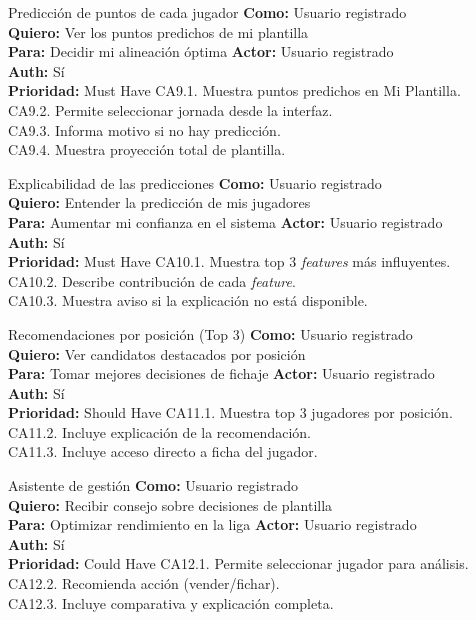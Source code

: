 {Predicción de puntos de cada jugador}
{\textbf{Como:} Usuario registrado\\ \textbf{Quiero:} Ver los puntos predichos de mi plantilla\\ \textbf{Para:} Decidir mi alineación óptima}
{\textbf{Actor:} Usuario registrado\\ \textbf{Auth:} Sí\\ \textbf{Prioridad:} Must Have}
{CA9.1. Muestra puntos predichos en Mi Plantilla.\\ CA9.2. Permite seleccionar jornada desde la interfaz.\\ CA9.3. Informa motivo si no hay predicción.\\ CA9.4. Muestra proyección total de plantilla.}

{Explicabilidad de las predicciones}
{\textbf{Como:} Usuario registrado\\ \textbf{Quiero:} Entender la predicción de mis jugadores\\ \textbf{Para:} Aumentar mi confianza en el sistema}
{\textbf{Actor:} Usuario registrado\\ \textbf{Auth:} Sí\\ \textbf{Prioridad:} Must Have}
{CA10.1. Muestra top 3 \textit{features} más influyentes.\\ CA10.2. Describe contribución de cada \textit{feature}.\\ CA10.3. Muestra aviso si la explicación no está disponible.}

{Recomendaciones por posición (Top 3)}
{\textbf{Como:} Usuario registrado\\ \textbf{Quiero:} Ver candidatos destacados por posición\\ \textbf{Para:} Tomar mejores decisiones de fichaje}
{\textbf{Actor:} Usuario registrado\\ \textbf{Auth:} Sí\\ \textbf{Prioridad:} Should Have}
{CA11.1. Muestra top 3 jugadores por posición.\\ CA11.2. Incluye explicación de la recomendación.\\ CA11.3. Incluye acceso directo a ficha del jugador.}

{Asistente de gestión}
{\textbf{Como:} Usuario registrado\\ \textbf{Quiero:} Recibir consejo sobre decisiones de plantilla\\ \textbf{Para:} Optimizar rendimiento en la liga}
{\textbf{Actor:} Usuario registrado\\ \textbf{Auth:} Sí\\ \textbf{Prioridad:} Could Have}
{CA12.1. Permite seleccionar jugador para análisis.\\ CA12.2. Recomienda acción (vender/fichar).\\ CA12.3. Incluye comparativa y explicación completa.}

